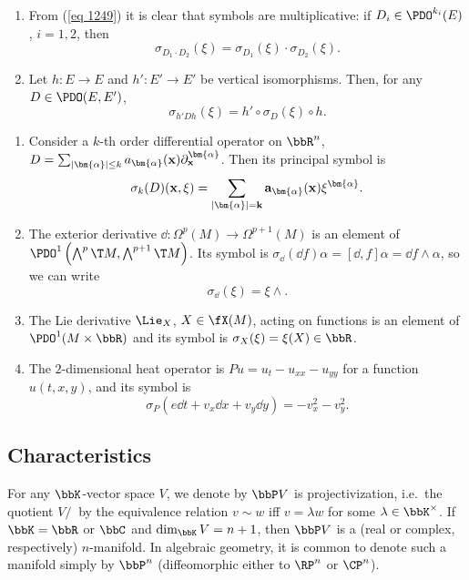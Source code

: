 \begin{rem}
    \begin{enumerate}
        \item From (\ref{eq 1249}) it is clear that symbols are multiplicative: if $D_i\in\PDO^{k_i}(E)$, $i=1,2$, then 
        \[\sigma_{D_1\cdot D_2}(\xi)=\sigma_{D_1}(\xi)\cdot \sigma_{D_2}(\xi).\]
        \item Let $h:E\to E$ and $h':E'\to E'$ be vertical isomorphisms. Then, for any $D\in\PDO(E,E')$, 
        \[\sigma_{h'Dh}(\xi)=h'\circ \sigma_D(\xi)\circ h.\]
    \end{enumerate}
\end{rem}


\begin{example}\label{ex symbols}
    \begin{enumerate}
        \item Consider a $k$-th order differential operator on $\bbR^n$, $D=\sum_{|\bm{\alpha}|\leq k}a_{\bm{\alpha}}(\bf{x})\partial^{\bm{\alpha}}_{\bf{x}}$. Then its principal symbol is 
        \[\sigma_k(D)(\bf{x},\xi)=\sum_{|\bm{\alpha}|= k}a_{\bm{\alpha}}(\bf{x})\xi^{\bm{\alpha}}.\]
        \item The exterior derivative $\dd:\Omega^p(M)\to \Omega^{p+1}(M)$ is an element of $\PDO^1\left(\bigwedge^p \T M,\bigwedge^{p+1}\T M\right)$. Its symbol is $\sigma_{\dd}(\dd f)\alpha=[\dd,f]\alpha=\dd f\wedge\alpha$, so we can write
        \[\sigma_{\dd}(\xi)=\xi\wedge.\]
        \item The Lie derivative $\Lie_X$, $X\in \fX(M)$, acting on functions is an element of $\PDO^1(M\times\bbR)$ and its symbol is $\sigma_X(\xi)=\xi(X)\in\bbR$.
        \item The $2$-dimensional heat operator is $Pu=u_t-u_{xx}-u_{yy}$ for a function $u(t,x,y)$, and its symbol is 
        \[\sigma_P(e\dd t+v_x\dd x+v_y\dd y)=-v_x^2-v_y^2.\]
    \end{enumerate}
\end{example}










\subsection{Characteristics}


For any $\bbK$-vector space $V$, we denote by $\bbP V$ is projectivization, i.e.\ the quotient $V\slash ~$ by the equivalence relation $v\sim w$ iff $v=\lambda w$ for some $\lambda\in\bbK^\times$. If $\bbK=\bbR$ or $\bbC$ and $\dim_\bbK V=n+1$, then $\bbP V$ is a (real or complex, respectively) $n$-manifold. In algebraic geometry, it is common to denote such a manifold simply by $\bbP^n$ (diffeomorphic either to $\RP^n$ or $\CP^n$).

